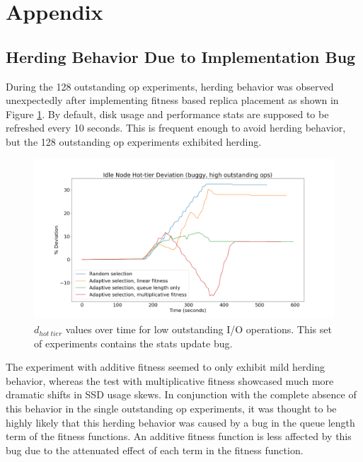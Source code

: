 \documentclass[12pt]{article}
\begin{document}
\newpage
\section{Appendix}

  \subsection{Herding Behavior Due to Implementation Bug}

  During the 128 outstanding op experiments, herding behavior
  was observed unexpectedly after implementing fitness based replica placement
  as shown in Figure \ref{fig:herding_bug}. By default, disk usage and
  performance stats are supposed to be refreshed every 10 seconds. This is
  frequent enough to avoid herding behavior, but the 128 outstanding op
  experiments exhibited herding.

  \begin{figure}[h]
    \centering
    \includegraphics[scale=0.30]{images/buggy.png} 
    \caption{$d_{hot\ tier}$ values over time for low outstanding I/O
             operations. This set of experiments contains the stats update bug.}
    \label{fig:herding_bug}
  \end{figure}

  The experiment with additive fitness seemed to only exhibit mild herding
  behavior, whereas the test with multiplicative fitness showcased much more
  dramatic shifts in SSD usage skews. In conjunction with the complete absence
  of this behavior in the single outstanding op experiments, it was thought to
  be highly likely that this herding behavior was caused by a bug in the queue
  length term of the fitness functions. An additive fitness function is less
  affected by this bug due to the attenuated effect of each term in the fitness
  function.
\end{document}
